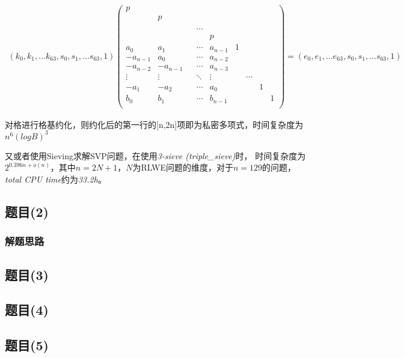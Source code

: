 \documentclass[12pt,a4paper]{article}
\numberwithin{equation}{section}
\begin{document}
\begin{align}
	(k_0,k_1,...k_{63},s_0,s_1,...s_{63},1)
	\left(
	\begin{smallmatrix}
			p\\
			&p\\
			&&\\
			&&&\cdots\\
			&&&&p\\
			a_0    &a_1    &   &\cdots &a_{n-1}            &1\\
			-a_{n-1}&a_0    &   &\cdots &a_{n-2}       &&\\
			-a_{n-2}&-a_{n-1}&   &\cdots &a_{n-3}  &&\\
			\vdots &\vdots &&\ddots &\vdots             &&\cdots\\
			-a_1    &-a_2    &   &\cdots &a_0 &&&1\\
			b_0    &b_1    &   &\cdots &b_{n-1}&&&&1\\
		\end{smallmatrix}
	\right)
	=
	(e_0,e_1,...e_{63},s_0,s_1,...s_{63},1)
\end{align}

对格进行格基约化，则约化后的第一行的[n,2n]项即为私密多项式，时间复杂度为$n^6 (logB)^3$\cite{adleman1981}

又或者使用Sieving求解SVP问题，在使用\textit{3-sieve (triple\_sieve)}时，
时间复杂度为$2^{0.396n+o(n)}$，其中$n=2N+1$，$N$为RLWE问题的维度，对于$n=129$的问题，
\textit{total CPU time}约为\textit{33.2h}\cite{cryptoeprint:2019/089}。

\subsection{题目(2)}

\subsubsection{解题思路}

\subsection{题目(3)}

\subsection{题目(4)}

\subsection{题目(5)}
\end{document}
